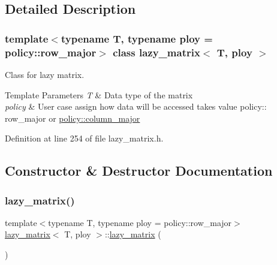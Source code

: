 \subsection{Detailed Description}
\subsubsection*{template$<$typename T, typename ploy = policy\+::row\+\_\+major$>$\newline
class lazy\+\_\+matrix$<$ T, ploy $>$}

Class for lazy matrix. 


\begin{DoxyTemplParams}{Template Parameters}
{\em T} & Data type of the matrix \\
\hline
{\em policy} & User case assign how data will be accessed takes value policy\+:\+: row\+\_\+major or \mbox{\hyperlink{classpolicy_1_1column__major}{policy\+::column\+\_\+major}} \\
\hline
\end{DoxyTemplParams}


Definition at line 254 of file lazy\+\_\+matrix.\+h.



\subsection{Constructor \& Destructor Documentation}
\mbox{\label{classlazy__matrix_a99f0fbe76db34e2ff6156ab644f06829}} 
\subsubsection{\texorpdfstring{lazy\_matrix()}{lazy\_matrix()}\hspace{0.1cm}{\footnotesize\ttfamily [1/6]}}
{\footnotesize\ttfamily template$<$typename T, typename ploy = policy\+::row\+\_\+major$>$ \\
\mbox{\hyperlink{classlazy__matrix}{lazy\+\_\+matrix}}$<$ T, ploy $>$\+::\mbox{\hyperlink{classlazy__matrix}{lazy\+\_\+matrix}} (\begin{DoxyParamCaption}{ }\end{DoxyParamCaption})\hspace{0.3cm}{\ttfamily [inline]}}



